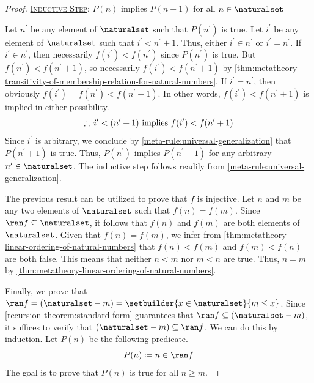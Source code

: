 \begin{proof}
    \vspace{0.3cm}
    \noindent
    \underline{\scshape Inductive Step}: \( P(n) \) implies \( P(n + 1) \) for all \( n \in \naturalset \)

    \vspace{0.3cm}
    \noindent
    Let \( n^{\prime} \) be any element of \( \naturalset \) such that \( P(n^{\prime}) \) is true.
    Let \( i^{\prime} \) be any element of \( \naturalset \) such that \( i^{\prime} < n^{\prime} + 1 \).
    Thus, either \( i^{\prime} \in n^{\prime} \) or \( i^{\prime} = n^{\prime} \).
    If \( i^{\prime} \in n^{\prime} \), then necessarily \( f(i^{\prime}) < f(n^{\prime}) \) since \( P(n^{\prime}) \) is true.
    But \( f(n^{\prime}) < f(n^{\prime} + 1) \), so necessarily \( f(i^{\prime}) < f(n^{\prime} + 1) \) by
    \cref{thm:metatheory-transitivity-of-membership-relation-for-natural-numbers}.
    If \( i^{\prime} = n^{\prime} \), then obviously \( f(i^{\prime}) = f(n^{\prime}) < f(n^{\prime} + 1) \).
    In other words, \( f(i^{\prime}) < f(n^{\prime} + 1) \) is implied in either possibility.
    \begin{equation*}
        \therefore \, i^{\prime} < \mleft( n^{\prime} + 1 \mright) \ \text{implies} \ f(i^{\prime}) < f(n^{\prime} + 1)
    \end{equation*}
    Since \( i^{\prime} \) is arbitrary, we conclude by \cref{meta-rule:universal-generalization} that
    \( P(n^{\prime} + 1) \) is true.
    Thus, \( P(n^{\prime}) \) implies \( P(n^{\prime} + 1) \) for any arbitrary \( n^{\prime} \in \naturalset \).
    The inductive step follows readily from \cref{meta-rule:universal-generalization}.

    \vspace{0.3cm}
    \noindent
    The previous result can be utilized to prove that \( f \) is injective.
    Let \( n \) and \( m \) be any two elements of \( \naturalset \) such that \( f(n) = f(m) \).
    Since \( \ran f \subseteq \naturalset \), it follows that \( f(n) \) and \( f(m) \) are both elements of \( \naturalset \).
    Given that \( f(n) = f(m) \), we infer from \cref{thm:metatheory-linear-ordering-of-natural-numbers} that
    \( f(n) < f(m) \) and \( f(m) < f(n) \) are both false.
    This means that neither \( n < m \) nor \( m < n \) are true.
    Thus, \( n = m \) by \cref{thm:metatheory-linear-ordering-of-natural-numbers}.

    \vspace{0.3cm}
    \noindent
    Finally, we prove that \( \ran f = \mleft( \naturalset - m \mright) = \setbuilder{x \in \naturalset}{m \leq x} \).
    Since \cref{recursion-theorem:standard-form} guarantees that \( \ran f \subseteq \mleft( \naturalset - m \mright) \),
    it suffices to verify that \( \mleft( \naturalset - m \mright) \subseteq \ran f \).
    We can do this by induction.
    Let \( P(n) \) be the following predicate.
    \begin{equation*}
        P(n) \coloneq n \in \ran f
    \end{equation*}
    The goal is to prove that \( P(n) \) is true for all \( n \geq m \).


\end{proof}
